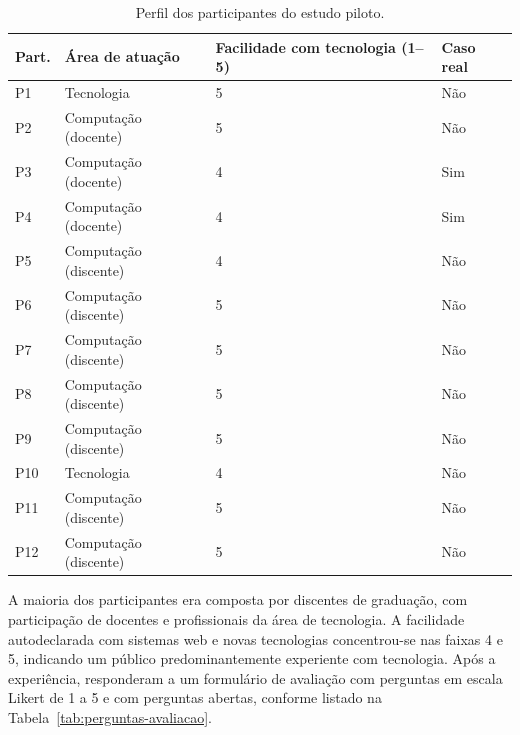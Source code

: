 \documentclass[article,a4paper,12pt,brazil,sumario=tradicional]{abntex2}
\begin{document}
\begin{table}[htbp]
    \centering
    \caption{Perfil dos participantes do estudo piloto.}
    \label{tab:perfil-participantes}
    \begin{tabular}{|C{1.5cm}|C{3.5cm}|C{2.5cm}|C{3.5cm}|}
        \hline
        \textbf{Part.} & \textbf{Área de atuação} & \textbf{Facilidade com tecnologia (1--5)} & \textbf{Caso real} \\
        \hline
        P1  & Tecnologia          & 5 & Não \\
        \hline
        P2  & Computação (docente) & 5 & Não \\
        \hline
        P3  & Computação (docente) & 4 & Sim \\
        \hline
        P4  & Computação (docente) & 4 & Sim \\
        \hline
        P5  & Computação (discente) & 4 & Não \\
        \hline
        P6  & Computação (discente) & 5 & Não \\
        \hline
        P7  & Computação (discente) & 5 & Não \\
        \hline
        P8  & Computação (discente) & 5 & Não \\
        \hline
        P9  & Computação (discente) & 5 & Não \\
        \hline
        P10 & Tecnologia           & 4 & Não \\
        \hline
        P11 & Computação (discente) & 5 & Não \\
        \hline
        P12 & Computação (discente) & 5 & Não \\
        \hline
    \end{tabular}

\end{table}

A maioria dos participantes era composta por discentes de graduação, com participação de docentes e profissionais da área de tecnologia. A facilidade autodeclarada com sistemas web e novas tecnologias concentrou-se nas faixas 4 e 5, indicando um público predominantemente experiente com tecnologia. Após a experiência, responderam a um formulário de avaliação com perguntas em escala Likert \cite{likert1932technique} de 1 a 5 e com perguntas abertas, conforme listado na Tabela~\ref{tab:perguntas-avaliacao}.
\end{document}
